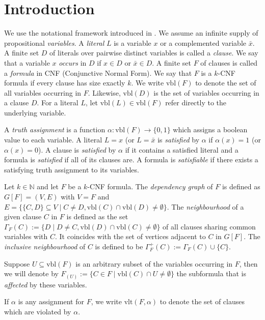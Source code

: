 \documentclass[11pt,a4paper]{article}
\begin{document}
\section{Introduction}

We use the notational framework introduced in \cite{Wel08}.
We assume an infinite supply of propositional \emph{variables}. A \emph{literal} $L$ is a variable $x$ 
or a complemented variable $\bar x$. A finite set $D$ of literals over pairwise distinct variables is 
called a \emph{clause}. We say that a variable $x$ \emph{occurs} in $D$ if $x \in D$ or $\bar x \in D$.
A finite set $F$ of clauses is called a \emph{formula} in CNF (Conjunctive Normal Form). We say that $F$
is a $k$-CNF formula if every clause has size exactly $k$. We write $\mbox{vbl}(F)$ to denote the set 
of all variables occurring in $F$. Likewise, $\mbox{vbl}(D)$ is the set of variables occurring in a clause
$D$. For a literal $L$, let $\mbox{vbl}(L) \in \mbox{vbl}(F)$ refer directly to the underlying variable.

A \emph{truth assignment} is a function $\alpha : \mbox{vbl}(F) \rightarrow \{0,1\}$ which assigns a boolean 
value to each variable. A literal $L = x$ (or $L = \bar x$ is \emph{satisfied} by $\alpha$ if $\alpha(x)=1$ 
(or $\alpha(x)=0$). A clause is \emph{satisfied} by $\alpha$ if it contains a satisfied literal and a formula 
is \emph{satisfied} if all of its clauses are. A formula is \emph{satisfiable} if there exists a satisfying
truth assignment to its variables.

Let $k \in \mathbb{N}$ and let $F$ be a $k$-CNF formula. The \emph{dependency graph} of $F$ is defined as
$G[F] = (V,E)$ with $V=F$ and 
$E = \{ \{C,D\} \subseteq V \; | \; C \ne D, \mbox{vbl}(C) \cap \mbox{vbl}(D) \ne \emptyset\}.$
The \emph{neighbourhood} of a given clause $C$ in $F$ is defined as the set 
$\Gamma_F(C) := \{ D \; | \; D \ne C, \mbox{vbl}(D) \cap \mbox{vbl}(C) \ne \emptyset \}$
of all clauses sharing common variables with $C$. It coincides with the set of vertices 
adjacent to $C$ in $G[F]$. 
The \emph{inclusive neighbourhood} of $C$ is defined to be $\Gamma_F^+(C) := \Gamma_F(C) \cup \{C\}$.

Suppose $U \subseteq \mbox{vbl}(F)$ is an arbitrary subset of the variables occurring in $F$, then we will denote
by $F_{(U)} := \{ C \in F \; | \; \mbox{vbl}(C) \cap U \ne \emptyset \}$ the subformula that is \emph{affected}
by these variables.

If $\alpha$ is any assignment for $F$, we write $\mbox{vlt}(F,\alpha)$ to
denote the set of clauses which are violated by $\alpha$.
\end{document}

